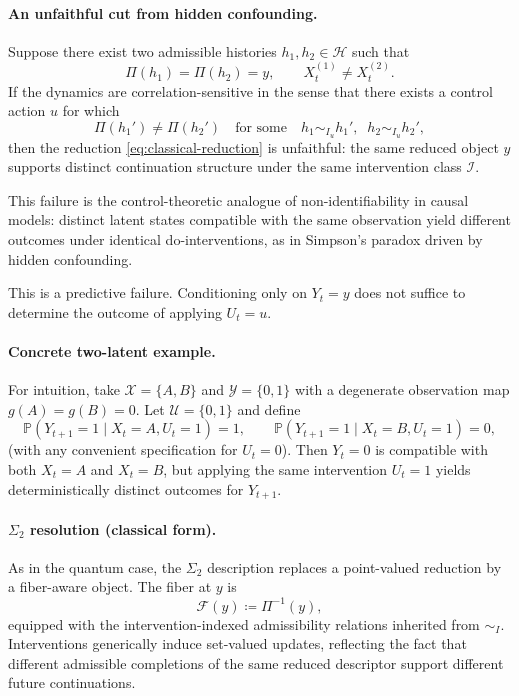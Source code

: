\paragraph{An unfaithful cut from hidden confounding.}
Suppose there exist two admissible histories $h_1,h_2\in\mathcal{H}$ such that
\begin{equation}
  \Pi(h_1)=\Pi(h_2)=y,
  \qquad
  X_t^{(1)} \neq X_t^{(2)}.
  \label{eq:classical-same-observation}
\end{equation}
If the dynamics are correlation-sensitive in the sense that there exists a
control action $u$ for which
\begin{equation}
  \Pi(h_1') \neq \Pi(h_2')
  \quad \text{for some}\quad
  h_1 \sim_{I_u} h_1',\;\; h_2 \sim_{I_u} h_2',
  \label{eq:classical-diverge}
\end{equation}
then the reduction \eqref{eq:classical-reduction} is unfaithful: the same
reduced object $y$ supports distinct continuation structure under the same
intervention class $\mathcal{I}$.

This failure is the control-theoretic analogue of non-identifiability in causal
models: distinct latent states compatible with the same observation yield
different outcomes under identical do-interventions, as in Simpson's paradox driven by hidden confounding.

This is a predictive failure. Conditioning only on $Y_t=y$ does not suffice
to determine the outcome of applying $U_t=u$.

\paragraph{Concrete two-latent example.}
For intuition, take $\mathcal{X}=\{A,B\}$ and $\mathcal{Y}=\{0,1\}$ with a
degenerate observation map $g(A)=g(B)=0$. Let $\mathcal{U}=\{0,1\}$ and define
\begin{equation}
  \mathbb{P}(Y_{t+1}=1 \mid X_t=A, U_t=1)=1,
  \qquad
  \mathbb{P}(Y_{t+1}=1 \mid X_t=B, U_t=1)=0,
  \label{eq:classical-two-latent}
\end{equation}
(with any convenient specification for $U_t=0$). Then $Y_t=0$ is compatible
with both $X_t=A$ and $X_t=B$, but applying the same intervention $U_t=1$
yields deterministically distinct outcomes for $Y_{t+1}$.

\paragraph{$\Sigma_2$ resolution (classical form).}
As in the quantum case, the $\Sigma_2$ description replaces a point-valued
reduction by a fiber-aware object. The fiber at $y$ is
\begin{equation}
  \mathcal{F}(y) \coloneqq \Pi^{-1}(y),
  \label{eq:classical-fiber}
\end{equation}
equipped with the intervention-indexed admissibility relations inherited
from $\sim_I$. Interventions generically induce set-valued updates, reflecting
the fact that different admissible completions of the same reduced descriptor
support different future continuations.

